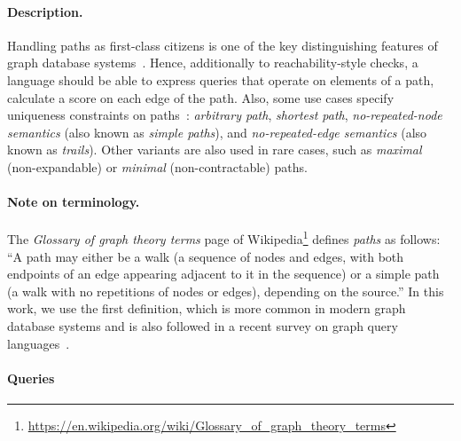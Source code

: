 
\paragraph{Description.}

Handling paths as first-class citizens is one of the key distinguishing features
of graph database systems~\cite{DBLP:conf/sigmod/AnglesABBFGLPPS18}. Hence,
additionally to reachability-style checks, a language should be able to express
queries that operate on elements of a path, \eg calculate a score on each edge
of the path. Also, some use cases specify uniqueness constraints on
paths~\cite{DBLP:journals/csur/AnglesABHRV17}: \emph{arbitrary path},
\emph{shortest path}, \emph{no-repeated-node semantics} (also known as
\emph{simple paths}), and \emph{no-repeated-edge semantics} (also known as
\emph{trails}). Other variants are also used in rare cases, such as
\emph{maximal} (non-expandable) or \emph{minimal} (non-contractable) paths.

\paragraph{Note on terminology.}

The \emph{Glossary of graph theory terms} page of
Wikipedia\footnote{\url{https://en.wikipedia.org/wiki/Glossary_of_graph_theory_terms}}
defines \emph{paths} as follows: ``A path may either be a walk (a sequence of
nodes and edges, with both endpoints of an edge appearing adjacent to it in the
sequence) or a simple path (a walk with no repetitions of nodes or edges),
depending on the source.'' In this work, we use the first definition, which is
more common in modern graph database systems and is also followed in a recent
survey on graph query languages~\cite{DBLP:journals/csur/AnglesABHRV17}.


\paragraph{Queries}
{\raggedright
}